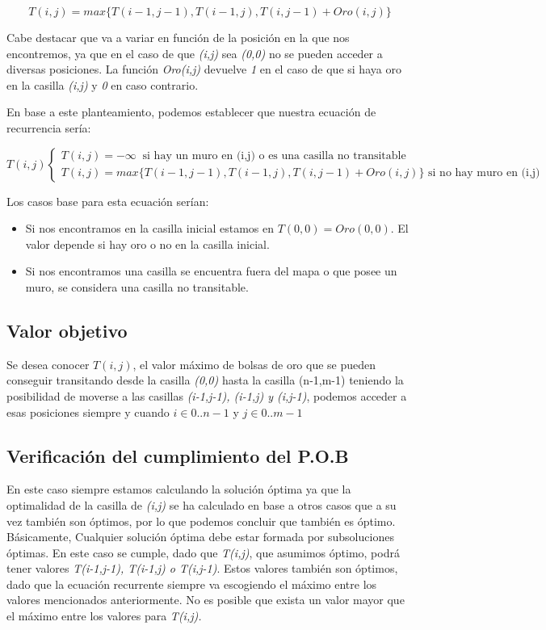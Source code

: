 \[T(i,j) = max \{T(i-1,j-1),T(i-1,j),T(i,j-1) + Oro(i,j)\} \]

Cabe destacar que va a variar en función de la posición en la que nos encontremos, ya que en el caso de que \textit{(i,j)} sea \textit{(0,0)} no se pueden acceder a diversas posiciones. La función \textit{Oro(i,j)} devuelve \textit{1} en el caso de que si haya oro en la casilla \textit{(i,j)} y \textit{0} en caso contrario.

En base a este planteamiento, podemos establecer que nuestra ecuación de recurrencia sería:

\[
T(i, j)  \begin{cases} 
T(i,j) = -\infty\ \text{   si hay un muro en (i,j) o es una casilla no transitable} \\
T(i,j) = max \{T(i-1,j-1),T(i-1,j),T(i,j-1) + Oro(i,j)\} \text{  si no hay muro en (i,j)}
\end{cases}
\]

Los casos base para esta ecuación serían: 

\begin{itemize}
    \item Si nos encontramos en la casilla inicial estamos en $T(0,0) = Oro (0,0)$. El valor depende si hay oro o no en la casilla inicial.
    \item Si nos encontramos una casilla se encuentra fuera del mapa o que posee un muro, se considera una casilla no transitable.
\end{itemize}

\subsection{Valor objetivo}

Se desea conocer $T(i,j)$, el valor máximo de bolsas de oro que se pueden conseguir transitando desde la casilla \textit{(0,0)} hasta la casilla (n-1,m-1) teniendo la posibilidad de moverse a las casillas \textit{(i-1,j-1), (i-1,j) y (i,j-1)}, podemos acceder a esas posiciones siempre y cuando \( i \in {0..n-1} \) y \( j \in {0..m-1} \)

\subsection{Verificación del cumplimiento del P.O.B}
En este caso siempre estamos calculando la solución óptima ya que la optimalidad de la casilla de \textit{(i,j)} se ha calculado en base a otros casos que a su vez también son óptimos, por lo que podemos concluir que también es óptimo. Básicamente, Cualquier solución óptima debe estar formada por subsoluciones óptimas. En este caso se cumple, dado que \textit{T(i,j)}, que asumimos óptimo, podrá tener valores \textit{T(i-1,j-1), T(i-1,j) o T(i,j-1)}. Estos valores también son óptimos, dado que la ecuación recurrente siempre va escogiendo el máximo entre los valores mencionados anteriormente. No es posible que exista un valor mayor que el máximo entre los valores para \textit{T(i,j).}

